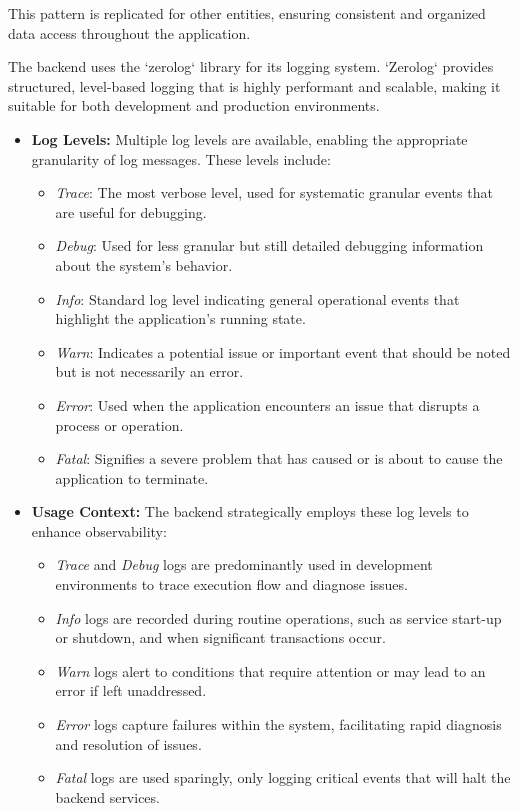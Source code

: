 This pattern is replicated for other entities, ensuring consistent and organized data access throughout the application.


The backend uses the `zerolog` library for its logging system.
`Zerolog` provides structured, level-based logging that is highly performant and scalable, making it suitable for both development and production environments.

\begin{itemize}
    \item \textbf{Log Levels:} Multiple log levels are available, enabling the appropriate granularity of log messages.
    These levels include:
    \begin{itemize}
        \item \textit{Trace}: The most verbose level, used for systematic granular events that are useful for debugging.
        \item \textit{Debug}: Used for less granular but still detailed debugging information about the system's behavior.
        \item \textit{Info}: Standard log level indicating general operational events that highlight the application's running state.
        \item \textit{Warn}: Indicates a potential issue or important event that should be noted but is not necessarily an error.
        \item \textit{Error}: Used when the application encounters an issue that disrupts a process or operation.
        \item \textit{Fatal}: Signifies a severe problem that has caused or is about to cause the application to terminate.
    \end{itemize}
    \item \textbf{Usage Context:} The backend strategically employs these log levels to enhance observability:
    \begin{itemize}
        \item \textit{Trace} and \textit{Debug} logs are predominantly used in development environments to trace execution flow and diagnose issues.
        \item \textit{Info} logs are recorded during routine operations, such as service start-up or shutdown, and when significant transactions occur.
        \item \textit{Warn} logs alert to conditions that require attention or may lead to an error if left unaddressed.
        \item \textit{Error} logs capture failures within the system, facilitating rapid diagnosis and resolution of issues.
        \item \textit{Fatal} logs are used sparingly, only logging critical events that will halt the backend services.
    \end{itemize}
\end{itemize}

